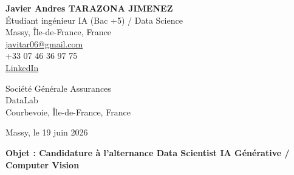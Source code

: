 \documentclass[10pt,a4paper]{article}
\begin{document}
\begin{minipage}[t]{0.48\textwidth}
\textbf{\large Javier Andres TARAZONA JIMENEZ}\\
Étudiant ingénieur IA (Bac +5) / Data Science\\
Massy, Île-de-France, France\\
\href{mailto:javitar06@gmail.com}{javitar06@gmail.com}\\
+33 07 46 36 97 75\\
\href{https://www.linkedin.com/in/javier-andres-tarazona-jimenez-84b489222/}{LinkedIn}
\end{minipage}
\hfill
\begin{minipage}[t]{0.42\textwidth}
\raggedleft
Société Générale Assurances\\
DataLab\\
Courbevoie, Île-de-France, France\\
\end{minipage}

\vspace{1.1cm}

\raggedleft
Massy, le 19 juin 2026

\vspace{0.7cm}

\raggedright
\textbf{Objet : Candidature à l'alternance Data Scientist IA Générative / Computer Vision}

\vspace{0.5cm}
\end{document}
